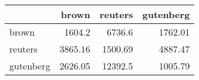 \begin{tabular}{lrrr}
\hline
           &   brown &   reuters &   gutenberg \\
\hline
 brown     & 1604.2  &   6736.6  &     1762.01 \\
 reuters   & 3865.16 &   1500.69 &     4887.47 \\
 gutenberg & 2626.05 &  12392.5  &     1005.79 \\
\hline
\end{tabular}